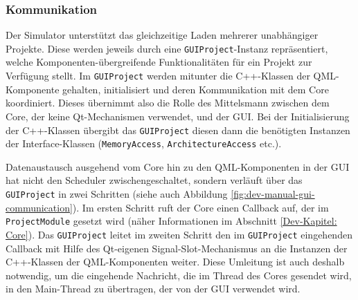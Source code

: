 \vspace{-0.1cm}
\subsubsection{Kommunikation}
\label{gui-kommunikation}
\vspace{-0.1cm}

Der Simulator unterstützt das gleichzeitige Laden mehrerer unabhängiger
Projekte. Diese werden jeweils durch eine \texttt{GUIProject}-Instanz
repräsentiert, welche Komponenten-über\-grei\-fen\-de Funktionalitäten für ein
Projekt zur Verfügung stellt. Im \texttt{GUIProject} werden mitunter die
C++-Klassen der QML-Komponente gehalten, initialisiert und deren Kommunikation
mit dem Core koordiniert. Dieses übernimmt also die Rolle des Mittelsmann
zwischen dem Core, der keine Qt-Mechanismen verwendet, und der GUI. Bei der
Initialisierung der C++-Klassen übergibt das \texttt{GUIProject} diesen dann die
benötigten Instanzen der Interface-Klassen (\texttt{MemoryAccess},
\texttt{ArchitectureAccess} etc.).

Datenaustausch ausgehend vom Core hin zu den QML-Komponenten in der GUI hat
nicht den Scheduler zwischengeschaltet, sondern verläuft über das
\texttt{GUIProject} in zwei Schritten (siehe auch Abbildung
\ref{fig:dev-manual-gui-communication}). Im ersten Schritt ruft der Core einen
Callback auf, der im \texttt{ProjectModule} gesetzt wird (näher Informationen im
Abschnitt \ref{Dev-Kapitel: Core}). Das \texttt{GUIProject} leitet im zweiten
Schritt den im \texttt{GUIProject} eingehenden Callback mit Hilfe des Qt-eigenen
Signal-Slot-Mechanismus an die Instanzen der C++-Klassen der QML-Komponenten
weiter. Diese Umleitung ist auch deshalb notwendig, um die eingehende Nachricht,
die im Thread des Cores gesendet wird, in den Main-Thread zu übertragen, der von
der GUI verwendet wird.

